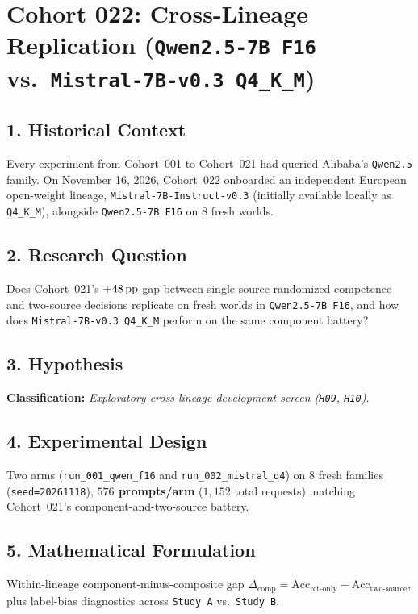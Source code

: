 \section{Cohort 022: Cross-Lineage Replication (\texttt{Qwen2.5-7B F16} vs.\ \texttt{Mistral-7B-v0.3 Q4\_K\_M})}

\subsection*{1. Historical Context}
Every experiment from Cohort~001 to Cohort~021 had queried Alibaba's \texttt{Qwen2.5} family. On November 16, 2026, Cohort~022 onboarded an independent European open-weight lineage, \texttt{Mistral-7B-Instruct-v0.3} (initially available locally as \texttt{Q4\_K\_M}), alongside \texttt{Qwen2.5-7B F16} on $8$ fresh worlds.

\subsection*{2. Research Question}
Does Cohort~021's $+48\,\mathrm{pp}$ gap between single-source randomized competence and two-source decisions replicate on fresh worlds in \texttt{Qwen2.5-7B F16}, and how does \texttt{Mistral-7B-v0.3 Q4\_K\_M} perform on the same component battery?

\subsection*{3. Hypothesis}
\textbf{Classification:} \emph{Exploratory cross-lineage development screen (\texttt{H09}, \texttt{H10}).}

\subsection*{4. Experimental Design}
Two arms (\texttt{run\_001\_qwen\_f16} and \texttt{run\_002\_mistral\_q4}) on $8$ fresh families (\texttt{seed=20261118}), \textbf{$576$ prompts/arm} ($1{,}152$ total requests) matching Cohort~021's component-and-two-source battery.

\subsection*{5. Mathematical Formulation}
Within-lineage component-minus-composite gap $\Delta_{\mathrm{comp}} = \mathrm{Acc}_{\mathrm{rct\text{-}only}} - \mathrm{Acc}_{\mathrm{two\text{-}source}}$, plus label-bias diagnostics across \texttt{Study A} vs.\ \texttt{Study B}.

